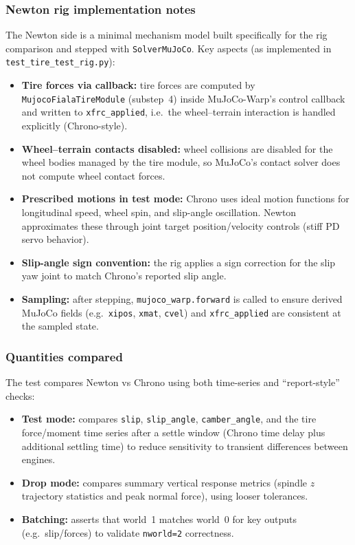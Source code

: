 \subsubsection{Newton rig implementation notes}
The Newton side is a minimal mechanism model built specifically for the rig comparison and stepped with \texttt{SolverMuJoCo}.
Key aspects (as implemented in \texttt{test\_tire\_test\_rig.py}):
\begin{itemize}
  \item \textbf{Tire forces via callback:}
    tire forces are computed by \texttt{MujocoFialaTireModule} (substep~4) inside MuJoCo-Warp's control callback and written to
    \texttt{xfrc\_applied}, i.e.\ the wheel--terrain interaction is handled explicitly (Chrono-style).
  \item \textbf{Wheel--terrain contacts disabled:}
    wheel collisions are disabled for the wheel bodies managed by the tire module, so MuJoCo's contact solver does not compute
    wheel contact forces.
  \item \textbf{Prescribed motions in test mode:}
    Chrono uses ideal motion functions for longitudinal speed, wheel spin, and slip-angle oscillation. Newton approximates these
    through joint target position/velocity controls (stiff PD servo behavior).
  \item \textbf{Slip-angle sign convention:}
    the rig applies a sign correction for the slip yaw joint to match Chrono's reported slip angle.
  \item \textbf{Sampling:}
    after stepping, \texttt{mujoco\_warp.forward} is called to ensure derived MuJoCo fields (e.g.\ \texttt{xipos}, \texttt{xmat}, \texttt{cvel})
    and \texttt{xfrc\_applied} are consistent at the sampled state.
\end{itemize}

\subsubsection{Quantities compared}
The test compares Newton vs Chrono using both time-series and ``report-style'' checks:
\begin{itemize}
  \item \textbf{Test mode:}
    compares \texttt{slip}, \texttt{slip\_angle}, \texttt{camber\_angle}, and the tire force/moment time series after a settle window
    (Chrono time delay plus additional settling time) to reduce sensitivity to transient differences between engines.
  \item \textbf{Drop mode:}
    compares summary vertical response metrics (spindle $z$ trajectory statistics and peak normal force), using looser tolerances.
  \item \textbf{Batching:}
    asserts that world~1 matches world~0 for key outputs (e.g.\ slip/forces) to validate \texttt{nworld=2} correctness.
\end{itemize}

